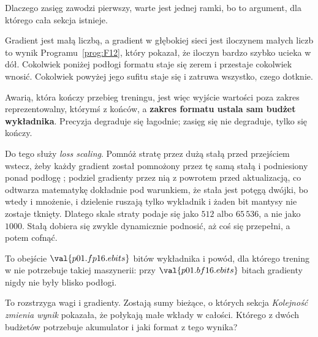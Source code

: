 \begin{fr}
Dlaczego zasięg zawodzi pierwszy, warte jest jednej ramki, bo to argument, dla
którego cała sekcja istnieje.

Gradient jest małą liczbą, a gradient w głębokiej sieci jest iloczynem małych
liczb \dash{} to wynik Programu~\ref{prog:F12}, który pokazał, że iloczyn
bardzo szybko ucieka w dół. Cokolwiek poniżej podłogi formatu staje się zerem
i przestaje cokolwiek wnosić. Cokolwiek powyżej jego sufitu staje się
 i zatruwa wszystko, czego dotknie.

Awarią, która kończy przebieg treningu, jest więc wyjście wartości poza zakres
reprezentowalny, którymś z końców, a \textbf{zakres formatu ustala sam budżet
wykładnika}. Precyzja degraduje się łagodnie; zasięg się nie degraduje, tylko
się kończy.

\begin{aibox}
Do tego służy \emph{loss scaling}. Pomnóż stratę przez dużą stałą przed
przejściem wstecz, żeby każdy gradient został pomnożony przez tę samą stałą i
podniesiony ponad podłogę ; podziel gradienty przez nią z powrotem
przed aktualizacją, co odtwarza matematykę dokładnie \dash{} pod warunkiem,
że stała jest potęgą dwójki, bo wtedy i mnożenie, i dzielenie ruszają tylko
wykładnik i żaden bit mantysy nie zostaje tknięty. Dlatego skale straty podaje
się jako $512$ albo $65\,536$, a nie jako $1000$. Stałą dobiera się zwykle
dynamicznie \dash{} podnosić, aż coś się przepełni, a potem cofnąć.

To obejście $\val{p01.fp16.ebits}$ bitów wykładnika i powód, dla którego
trening w  nie potrzebuje takiej maszynerii: przy
$\val{p01.bf16.ebits}$ bitach gradienty nigdy nie były blisko podłogi.
\end{aibox}

To rozstrzyga wagi i gradienty. Zostają sumy bieżące, o których sekcja \emph{Kolejność zmienia wynik}
pokazała, że połykają małe wkłady w całości. Którego z dwóch budżetów
potrzebuje akumulator i jaki format z tego wynika?
\dotline
\nextframe
\end{fr}

